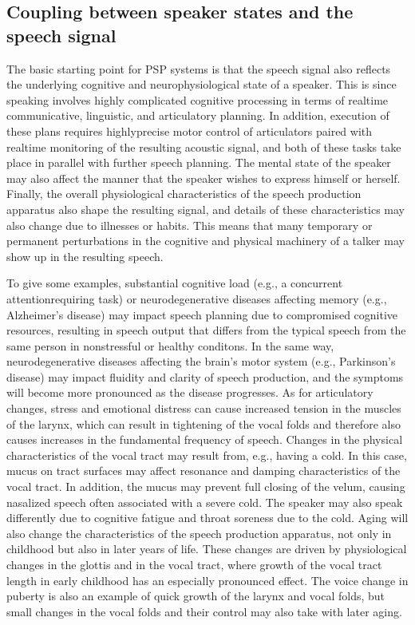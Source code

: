 \documentclass[letterpaper,10pt,english]{jupyterBook}
\begin{document}
\subsection{Coupling between speaker states and the speech signal}
\label{\detokenize{Recognition/Paralinguistic_speech_processing:coupling-between-speaker-states-and-the-speech-signal}}
\sphinxAtStartPar
The basic starting point for PSP systems is that the speech signal also
reflects the underlying cognitive and neurophysiological state of a
speaker. This is since speaking involves highly complicated cognitive
processing in terms of real\sphinxhyphen{}time communicative, linguistic, and
articulatory planning. In addition, execution of these plans requires
highly\sphinxhyphen{}precise motor control of articulators paired with real\sphinxhyphen{}time
monitoring of the resulting acoustic signal, and both of these tasks
take place in parallel with further speech planning. The mental state of
the speaker may also affect the manner that the speaker wishes to
express himself or herself.  Finally, the overall physiological
characteristics of the speech production apparatus also shape the
resulting signal, and details of these characteristics may also change
due to illnesses or habits. This means that many temporary or permanent
perturbations in the cognitive and physical machinery of a talker may
show up in the resulting speech.

\sphinxAtStartPar
To give some examples, substantial cognitive load (e.g., a concurrent
attention\sphinxhyphen{}requiring task) or neurodegenerative diseases affecting memory
(e.g., Alzheimer’s disease) may impact speech planning due to
compromised cognitive resources, resulting in speech output that differs
from the typical speech from the same person in non\sphinxhyphen{}stressful or healthy
conditons. In the same way, neurodegenerative diseases affecting the
brain’s motor system (e.g., Parkinson’s disease) may impact fluidity and
clarity of speech production, and the symptoms will become more
pronounced as the disease progresses. As for articulatory changes,
stress and emotional distress can cause increased tension in the muscles
of the larynx, which can result in tightening of the vocal folds and
therefore also causes increases in the fundamental frequency of speech.
Changes in the physical characteristics of the vocal tract may result
from, e.g., having a cold. In this case, mucus on tract surfaces may
affect resonance and damping characteristics of the vocal tract. In
addition, the mucus may prevent full closing of the velum, causing
nasalized speech often associated with a severe cold. The speaker may
also speak differently due to cognitive fatigue and throat soreness due
to the cold. Aging will also change the characteristics of the speech
production apparatus, not only in childhood but also in later years of
life. These changes are driven by physiological changes in the glottis
and in the vocal tract, where growth of the vocal tract length in early
childhood has an especially pronounced effect. The voice change in
puberty is also an example of quick growth of the larynx and vocal
folds, but small changes in the vocal folds and their control may also
take with later aging.
\end{document}
